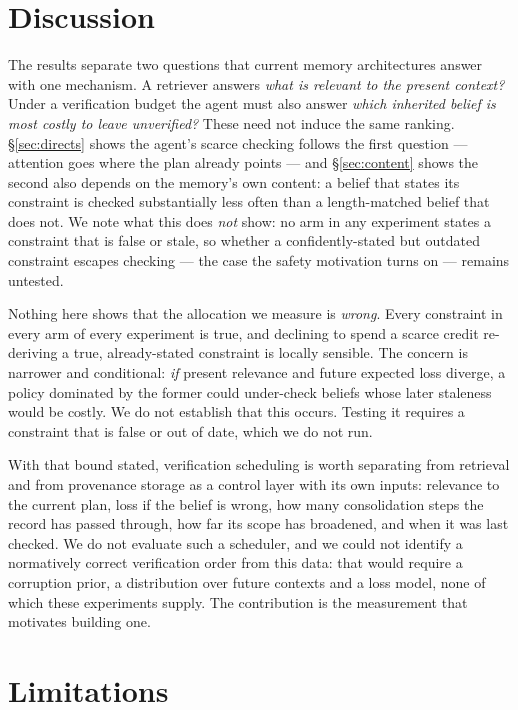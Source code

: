 \section{Discussion}\label{sec:discussion}

The results separate two questions that current memory architectures answer with
one mechanism. A retriever answers \emph{what is relevant to the present
context?} Under a verification budget the agent must also answer \emph{which
inherited belief is most costly to leave unverified?} These need not induce the same ranking. \S\ref{sec:directs} shows the agent's scarce checking follows the
first question --- attention goes where the plan already points --- and
\S\ref{sec:content} shows the second also depends on the memory's own content:
a belief that states its constraint is checked substantially less often than a
length-matched belief that does not. We
note what this does \emph{not} show: no arm in any experiment states a
constraint that is false or stale, so whether a confidently-stated but outdated
constraint escapes checking --- the case the safety motivation turns on ---
remains untested.

Nothing here shows that the allocation we measure is \emph{wrong}. Every
constraint in every arm of every experiment is true, and declining to spend a
scarce credit re-deriving a true, already-stated constraint is locally sensible.
The concern is narrower and conditional: \emph{if} present relevance and future
expected loss diverge, a policy dominated by the former could under-check
beliefs whose later staleness would be costly. We do not establish that this
occurs. Testing it requires a constraint that is false or out of date, which we
do not run.

With that bound stated, verification scheduling is worth separating from
retrieval and from provenance storage as a control layer with its own inputs: relevance to the current plan,
loss if the belief is wrong, how many consolidation steps the record has passed
through, how far its scope has broadened, and when it was last checked. We do
not evaluate such a scheduler, and we could not identify a normatively correct
verification order from this data: that would require a corruption prior, a
distribution over future contexts and a loss model, none of which these
experiments supply. The contribution is the measurement that motivates building
one.

\section{Limitations}\label{sec:limits}

